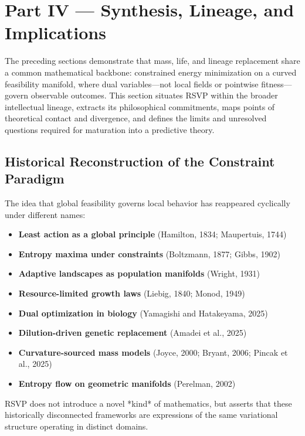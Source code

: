 \documentclass[11pt,a4paper]{article}
\begin{document}
\clearpage
\section{Part IV — Synthesis, Lineage, and Implications}

The preceding sections demonstrate that mass, life, and lineage replacement share a common mathematical backbone: constrained energy minimization on a curved feasibility manifold, where dual variables—not local fields or pointwise fitness—govern observable outcomes. This section situates RSVP within the broader intellectual lineage, extracts its philosophical commitments, maps points of theoretical contact and divergence, and defines the limits and unresolved questions required for maturation into a predictive theory.

\subsection{Historical Reconstruction of the Constraint Paradigm}

The idea that global feasibility governs local behavior has reappeared cyclically under different names:

\begin{itemize}
    \item \textbf{Least action as a global principle} (Hamilton, 1834; Maupertuis, 1744)
    \item \textbf{Entropy maxima under constraints} (Boltzmann, 1877; Gibbs, 1902)
    \item \textbf{Adaptive landscapes as population manifolds} (Wright, 1931)
    \item \textbf{Resource-limited growth laws} (Liebig, 1840; Monod, 1949)
    \item \textbf{Dual optimization in biology} (Yamagishi and Hatakeyama, 2025)
    \item \textbf{Dilution-driven genetic replacement} (Amadei et al., 2025)
    \item \textbf{Curvature-sourced mass models} (Joyce, 2000; Bryant, 2006; Pincak et al., 2025)
    \item \textbf{Entropy flow on geometric manifolds} (Perelman, 2002)
\end{itemize}

RSVP does not introduce a novel *kind* of mathematics, but asserts that these historically disconnected frameworks are expressions of the same variational structure operating in distinct domains.
\end{document}
